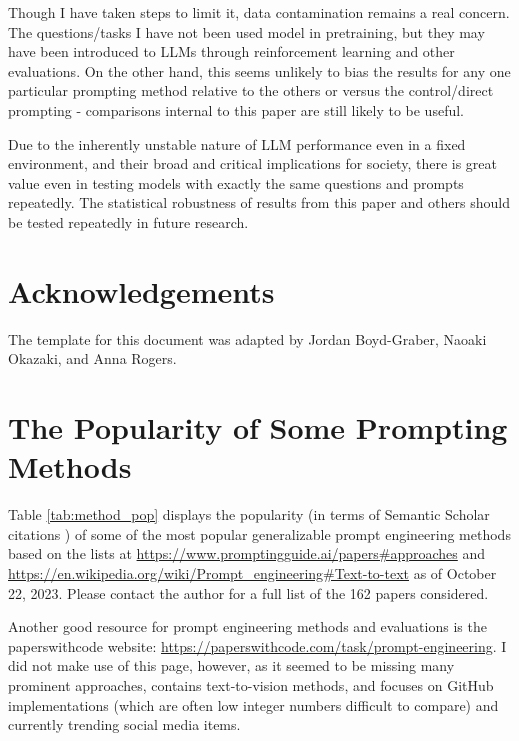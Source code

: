 \documentclass[11pt]{article}
\begin{document}
Though I have taken steps to limit it, data contamination remains a real concern. The questions/tasks I have not been used model in pretraining, but they may have been introduced to LLMs through reinforcement learning and other evaluations. On the other hand, this seems unlikely to bias the results for any one particular prompting method relative to the others or versus the control/direct prompting - comparisons internal to this paper are still likely to be useful.

Due to the inherently unstable nature of LLM performance even in a fixed environment, and their broad and critical implications for society, there is great value even in testing models with exactly the same questions and prompts repeatedly. The statistical robustness of results from this paper and others should be tested repeatedly in future research.

\section*{Acknowledgements}
The template for this document was adapted by Jordan Boyd-Graber, Naoaki Okazaki, and Anna Rogers.




\appendix

\section{The Popularity of Some Prompting Methods}
\label{sec:popularity}

Table \ref{tab:method_pop} displays the popularity (in terms of Semantic Scholar citations \cite{noauthor_semantic_nodate}) of some of the most popular generalizable prompt engineering methods based on the lists at \url{https://www.promptingguide.ai/papers#approaches} and \url{https://en.wikipedia.org/wiki/Prompt_engineering#Text-to-text} as of October 22, 2023. Please contact the author for a full list of the 162 papers considered.

Another good resource for prompt engineering methods and evaluations is the paperswithcode website: \url{https://paperswithcode.com/task/prompt-engineering}. I did not make use of this page, however, as it seemed to be missing many prominent approaches, contains text-to-vision methods, and focuses on GitHub implementations (which are often low integer numbers difficult to compare) and currently trending social media items.
\end{document}
